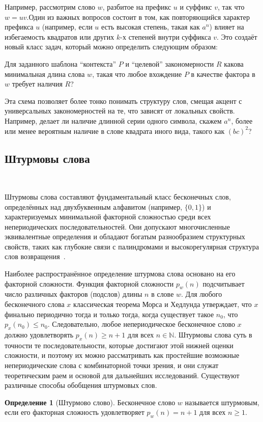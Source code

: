 \documentclass[a4paper,14pt]{extreport}
\theoremstyle{plain}
\theoremstyle{definition}
\newtheorem{definition}{Определение}[section]
\theoremstyle{remark}
\begin{document}
Например, рассмотрим слово $w$, разбитое на префикс $u$ и суффикс $v$, так что $w=uv$.Один из важных вопросов состоит в том, как повторяющийся характер префикса $u$ (например, если $u$ есть высокая степень, такая как $a^n$) влияет на избегаемость квадратов или других $k$-х степеней внутри суффикса $v$. Это создаёт новый класс задач, который можно определить следующим образом:

Для заданного шаблона ``контекста'' $P$ и ``целевой'' закономерности $R$ какова минимальная длина слова $w$, такая что любое вхождение $P$ в качестве фактора в $w$ требует наличия $R$?

Эта схема позволяет более тонко понимать структуру слов, смещая акцент с универсальных закономерностей на те, что зависят от локальных свойств. Например, делает ли наличие длинной серии одного символа, скажем $a^n$, более или менее вероятным наличие в слове квадрата иного вида, такого как $(bc)^2$?
\subsection{Штурмовы слова}~\label{sec2.1.1}

Штурмовы слова составляют фундаментальный класс бесконечных слов, определённых над двухбуквенным алфавитом (например, $\{0,1\}$) и характеризуемых минимальной факторной сложностью среди всех непериодических последовательностей. Они допускают многочисленные эквивалентные определения и обладают богатым разнообразием структурных свойств, таких как глубокие связи с палиндромами и высокорегулярная структура слов возвращения~\cite{Lothaire2002}.

Наиболее распространённое определение штурмова слова основано на его факторной сложности. Функция факторной сложности $p_w(n)$ подсчитывает число различных факторов (подслов) длины $n$ в слове $w$. Для любого бесконечного слова $x$ классическая теорема Морса и Хедлунда утверждает, что $x$ финально периодично тогда и только тогда, когда существует такое $n_0$, что $p_x(n_0) \leq n_0$. Следовательно, любое непериодическое бесконечное слово $x$ должно удовлетворять $p_x(n) \geq n+1$ для всех $n \in \mathbb{N}$. Штурмовы слова суть в точности те последовательности, которые достигают этой нижней оценки сложности, и поэтому их можно рассматривать как простейшие возможные непериодические слова с комбинаторной точки зрения, и они служат теоретическим раем и основой для дальнейших исследований. Существуют различные способы обобщения штурмовых слов.

\begin{definition}[Штурмово слово]\label{stu1}
	Бесконечное слово $w$ называется штурмовым, если его факторная сложность удовлетворяет $p_w(n) = n+1$ для всех $n \geq 1$.
\end{definition}
\end{document}
